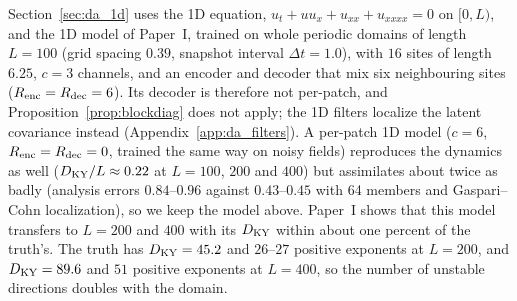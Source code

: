 Section~\ref{sec:da_1d} uses the 1D equation,
$u_t + u u_x + u_{xx} + u_{xxxx} = 0$ on $[0,L)$, and the 1D model of
Paper~I, trained on whole periodic domains of length $L=100$ (grid spacing
$0.39$, snapshot interval $\Delta t=1.0$), with $16$ sites of length $6.25$,
$c=3$ channels, and an encoder and decoder that mix six neighbouring sites
($R_{\mathrm{enc}}=R_{\mathrm{dec}}=6$). Its decoder is therefore not per-patch, and
Proposition~\ref{prop:blockdiag} does not apply; the 1D filters localize
the latent covariance instead (Appendix~\ref{app:da_filters}). A per-patch 1D model ($c=6$,
$R_{\mathrm{enc}}=R_{\mathrm{dec}}=0$, trained the same way on noisy fields) reproduces the dynamics as well ($D_{\mathrm{KY}}/L\approx0.22$
at $L=100$, $200$ and $400$) but assimilates about twice as badly (analysis errors $0.84$--$0.96$ against
$0.43$--$0.45$ with 64 members and Gaspari--Cohn localization), so we keep the model above. Paper~I shows
that this model transfers to $L=200$ and $400$ with its $D_{\mathrm{KY}}$ within about one
percent of the truth's. The truth has $D_{\mathrm{KY}}=45.2$ and $26$--$27$ positive exponents
at $L=200$, and $D_{\mathrm{KY}}=89.6$ and $51$ positive exponents at $L=400$, so the number of
unstable directions doubles with the domain.
